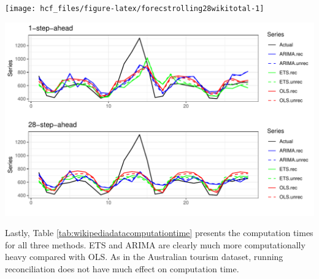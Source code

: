 \documentclass[11pt,a4paper,]{article}
\let\origfigure\figure
\let\endorigfigure\endfigure
\renewenvironment{figure}[1][2] {
    \expandafter\origfigure\expandafter[!htbp]
} {
    \endorigfigure
}
\begin{document}
\begin{figure}

{\centering \texttt{[image: hcf\_files/figure-latex/forecstrolling28wikitotal-1]} 

}

\caption{The actual test set for the 'Total' series compared to the forecasts from reconciled and unreconciled ETS, ARIMA and OLS methods for 1-step-ahead and 28-step-ahead Wikipedia pageviews.}\label{fig:forecstrolling28wikitotal}
\end{figure}

\begin{figure}

{\centering \includegraphics[width=1\linewidth]{hcf_files/figure-latex/forecstrolling28wiki-1} 

}

\caption{The actual test set for the 'desktopusenPho21' bottom level series compared to the forecasts from reconciled and unreconciled ETS, ARIMA and OLS methods for 1-step-ahead and 28-step-ahead Wikipedia pageviews.}\label{fig:forecstrolling28wiki}
\end{figure}

Lastly, Table \ref{tab:wikipediadatacomputationtime} presents the computation times for all three methods. ETS and ARIMA are clearly much more computationally heavy compared with OLS. As in the Australian tourism dataset, running reconciliation does not have much effect on computation time.
\end{document}
